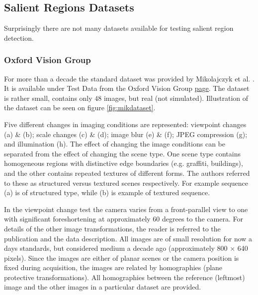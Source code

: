\subsection{Salient Regions Datasets} \label{sec:salregdb}
Surprisingly there are not many datasets available for testing salient region detection.

\subsubsection{Oxford Vision Group}

For more than a decade the standard dataset was provided by Mikolajczyk et al. \cite{Mikolajczyk:2005}. It is available under Test Data from the Oxford Vision Group \href{http://www.robots.ox.ac.uk/~vgg/research/affine/index.html}{\underline{page}}. The dataset is rather small, contains only $48$ images, but real (not simulated). Illustration of the dataset can be seen on figure \ref{fig:mikdataset}. 

 Five different changes in imaging conditions are represented: viewpoint changes (a) \& (b); scale changes (c) \& (d); image blur (e) \& (f); JPEG compression (g); and illumination (h). The effect of changing the image conditions can be separated from
the effect of changing the scene type. One scene type contains homogeneous regions with distinctive edge boundaries (e.g. graffiti, buildings), and the other contains
repeated textures of different forms. The authors referred to these as structured versus textured scenes respectively. For example sequence (a) is of structured type, while (b) is example of textured sequence.

In the viewpoint change test the camera varies from a front-parallel view to one with significant foreshortening
at approximately 60 degrees to the camera. For details of the other image transformations, the reader is referred to the publication \cite{Mikolajczyk:2005} and the data description.   All images are of small resolution for now a days standards, but considered medium a decade ago (approximately 800 $\times$ 640 pixels).
Since the images are either of planar scenes or the camera position is fixed during acquisition, the images are related by homographies (plane
protective transformations). All homographies between the reference (leftmost) image and the other images in a particular dataset are provided.

